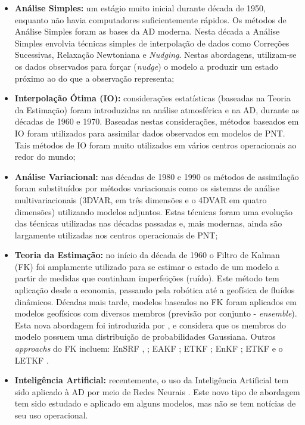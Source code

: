 \begin{itemize}
\item \textbf{Análise Simples:} um estágio muito inicial durante década de 1950, enquanto não havia computadores suficientemente rápidos. Os métodos de Análise Simples foram as bases da AD moderna. Nesta década a Análise Simples envolvia técnicas simples de interpolação de dados como Correções Sucessivas, Relaxação Newtoniana e \textit{Nudging}. Nestas abordagens, utilizam-se os dados observados para forçar (\textit{nudge}) o modelo a produzir um estado próximo ao do que a observação representa;
\item \textbf{Interpolação Ótima (IO):} considerações estatísticas (baseadas na Teoria da Estimação) foram introduzidas na análise atmosférica e na AD, durante as décadas de 1960 e 1970. Baseadas nestas considerações, métodos baseados em IO foram utilizados para assimilar dados observados em modelos de PNT. Tais métodos de IO foram muito utilizados em vários centros operacionais ao redor do mundo;
\item \textbf{Análise Variacional:} nas décadas de 1980 e 1990 os métodos de assimilação foram substituídos por métodos variacionais como os sistemas de análise multivariacionais (3DVAR, em três dimensões e o 4DVAR em quatro dimensões) utilizando modelos adjuntos. Estas técnicas foram uma evolução das técnicas utilizadas nas décadas passadas e, mais modernas, ainda são largamente utilizadas nos centros operacionais de PNT; 
\item \textbf{Teoria da Estimação:} no início da década de 1960 o Filtro de Kalman (FK) foi amplamente utilizado para se estimar o estado de um modelo a partir de medidas que continham imperfeições (ruído). Este método tem aplicação desde a economia, passando pela robótica até a geofísica de fluídos dinâmicos. Décadas mais tarde, modelos baseados no FK foram aplicados em modelos geofísicos com diversos membros (previsão por conjunto - \textit{ensemble}). Esta nova abordagem foi introduzida por \cite{evensen94}, \cite{evensen03} e considera que os membros do modelo possuem uma distribuição de probabilidades Gaussiana. Outros \textit{approachs} do FK incluem: EnSRF \cite{andres68}, \cite{withakerhamill02}; EAKF \cite{anderson01}; ETKF \cite{bishopetal01}; EnKF \cite{kalnay04}; ETKF \cite{kalnay03} e o LETKF \cite{hunt05}.
\item \textbf{Inteligência Artificial:} recentemente, o uso da Inteligência Artificial tem sido aplicado à AD por meio de Redes Neurais \cite{nowosad01}. Este novo tipo de abordagem tem sido estudado e aplicado em alguns modelos, mas não se tem notícias de seu uso operacional.
\end{itemize}

